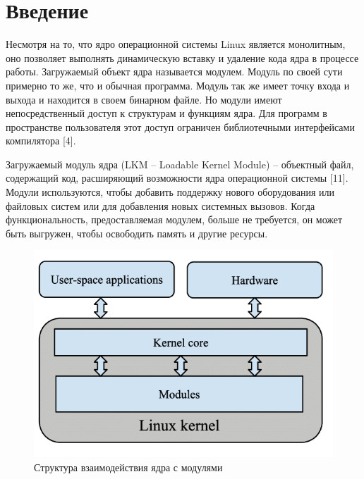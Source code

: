 







\tableofcontents
\newpage


\section{Введение}

Несмотря на то, что ядро операционной системы Linux является монолитным, оно позволяет выполнять динамическую вставку и удаление кода ядра в процессе работы. Загружаемый объект ядра называется модулем. Модуль по своей сути примерно то же, что и обычная программа. Модуль так же имеет точку входа и выхода и находится в своем бинарном файле. Но модули имеют непосредственный доступ к структурам и функциям ядра. Для программ в пространстве пользователя этот доступ ограничен библиотечными интерфейсами компилятора [4].

Загружаемый модуль ядра (LKM -- Loadable Kernel Module) -- объектный файл, содержащий код, расширяющий возможности ядра операционной системы [11]. Модули используются, чтобы добавить поддержку нового оборудования или файловых систем или для добавления новых системных вызовов. Когда функциональность, предоставляемая модулем, больше не требуется, он может быть выгружен, чтобы освободить память и другие ресурсы.

\begin{figure}[H]
	\centering
	\includegraphics[width=0.6\linewidth]{module}
	\caption{Структура взаимодействия ядра с модулями}
\end{figure}

